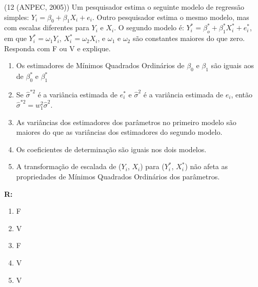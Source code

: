 \documentclass[12pt,letterpaper, onecolumn]{exam}
\renewenvironment{solution}
  {\par\noindent\textbf{R:}\enspace\color{blue}}
  {\par\color{black}}
\begin{document}
\begin{questions}
\question (12 (ANPEC, 2005)) Um pesquisador estima o seguinte modelo de regressão simples: $Y_i = \beta_0 + \beta_1X_i + e_i$. Outro pesquisador estima o mesmo modelo, mas com escalas diferentes para $Y_i$ e $X_i$. O segundo modelo é: $Y^*_i = \beta_o^* + \beta_1^*X^*_i + e_i^*$, em que $Y^*_i = \omega_1Y_i$, $X^*_i = \omega_2X_i$, e $\omega_1$ e $\omega_2$ são constantes maiores do que zero. Responda com F ou V e explique.
\begin{enumerate}[label=(\arabic*), start=0]
    \item Os estimadores de Mínimos Quadrados Ordinários de $\beta_0$ e $\beta_1$ são iguais aos de $\beta_0^*$ e $\beta_1^*$
    \item Se $\hat \sigma^{*2}$ é a variância estimada de $e^*_i$ e $\hat \sigma^2$ é a variância estimada de $e_i$, então $\hat\sigma^{*2} = w^2_1\hat\sigma^2$.
    \item As variâncias dos estimadores dos parâmetros no primeiro modelo são maiores do que as variâncias dos estimadores do segundo modelo.
    \item Os coeficientes de determinação são iguais nos dois modelos.
    \item A transformação de escalada de ($Y_i$, $X_i$) para ($Y_i^*$, $X_i^*$) não afeta as propriedades de Mínimos Quadrados Ordinários dos parâmetros.
\end{enumerate}
\begin{solution}
    \begin{enumerate}[label=(\arabic*), start = 0]
        \item F
        \item V
        \item F
        \item V
        \item V
    \end{enumerate}
\end{solution}


\end{questions}
\end{document}
